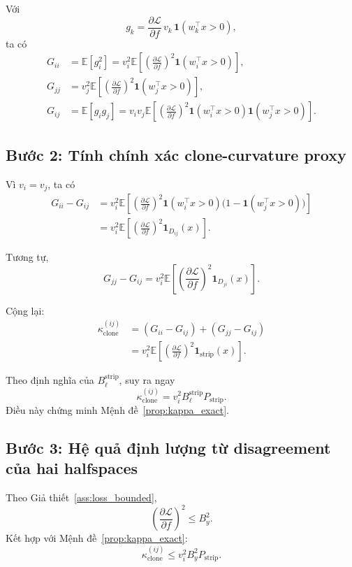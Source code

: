 \documentclass[11pt,a4paper]{article}
\newcommand{\E}{\mathbb{E}}
\newcommand{\Ind}{\mathbf 1}
\begin{document}
Với
\[
g_k = \frac{\partial \mathcal L}{\partial f}\, v_k \,\Ind(w_k^\top x > 0),
\]
ta có
\begin{align}
G_{ii}
&=
\E[g_i^2]
=
v_i^2 \E\!\left[
\left(\frac{\partial \mathcal L}{\partial f}\right)^2
\Ind(w_i^\top x > 0)
\right], \\
G_{jj}
&=
v_j^2 \E\!\left[
\left(\frac{\partial \mathcal L}{\partial f}\right)^2
\Ind(w_j^\top x > 0)
\right], \\
G_{ij}
&=
\E[g_i g_j]
=
v_i v_j \E\!\left[
\left(\frac{\partial \mathcal L}{\partial f}\right)^2
\Ind(w_i^\top x > 0)\Ind(w_j^\top x > 0)
\right].
\end{align}

\subsection*{Bước 2: Tính chính xác clone-curvature proxy}

Vì $v_i = v_j$, ta có
\begin{align}
G_{ii} - G_{ij}
&=
v_i^2 \E\!\left[
\left(\frac{\partial \mathcal L}{\partial f}\right)^2
\Ind(w_i^\top x > 0)\bigl(1 - \Ind(w_j^\top x > 0)\bigr)
\right] \\
&=
v_i^2 \E\!\left[
\left(\frac{\partial \mathcal L}{\partial f}\right)^2
\Ind_{D_{ij}}(x)
\right].
\end{align}

Tương tự,
\[
G_{jj} - G_{ij}
=
v_i^2 \E\!\left[
\left(\frac{\partial \mathcal L}{\partial f}\right)^2
\Ind_{D_{ji}}(x)
\right].
\]

Cộng lại:
\begin{align}
\kappa_{\mathrm{clone}}^{(ij)}
&=
(G_{ii}-G_{ij}) + (G_{jj}-G_{ij}) \\
&=
v_i^2 \E\!\left[
\left(\frac{\partial \mathcal L}{\partial f}\right)^2
\Ind_{\mathrm{strip}}(x)
\right].
\end{align}

Theo định nghĩa của $B_\ell^{\mathrm{strip}}$, suy ra ngay
\[
\kappa_{\mathrm{clone}}^{(ij)}
=
v_i^2 B_\ell^{\mathrm{strip}} P_{\mathrm{strip}}.
\]
Điều này chứng minh Mệnh đề~\ref{prop:kappa_exact}.

\subsection*{Bước 3: Hệ quả định lượng từ disagreement của hai halfspaces}

Theo Giả thiết~\ref{ass:loss_bounded},
\[
\left(\frac{\partial \mathcal L}{\partial f}\right)^2 \le B_y^2.
\]
Kết hợp với Mệnh đề~\ref{prop:kappa_exact}:
\[
\kappa_{\mathrm{clone}}^{(ij)}
\le
v_i^2 B_y^2 P_{\mathrm{strip}}.
\]
\end{document}
